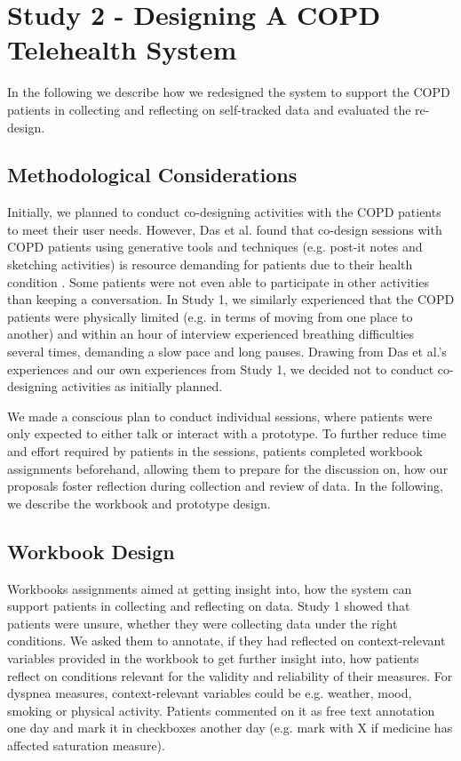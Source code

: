 \section{Study 2 - Designing A COPD Telehealth System}     
In the following we describe how we redesigned the system to support the COPD patients in collecting and reflecting on self-tracked data and evaluated the re-design. 

\subsection{Methodological Considerations}
Initially, we planned to conduct co-designing activities with the COPD patients to meet their user needs. However, Das et al. found that co-design sessions with COPD patients using generative tools and techniques (e.g. post-it notes and sketching activities) is resource demanding for patients due to their health condition \cite{Das}. Some patients were not even able to participate in other activities than keeping a conversation. In Study 1, we similarly experienced that the COPD patients were physically limited (e.g. in terms of moving from one place to another) and within an hour of interview experienced breathing difficulties several times, demanding a slow pace and long pauses. Drawing from Das et al.'s experiences and our own experiences from Study 1, we decided not to conduct co-designing activities as initially planned. 

We made a conscious plan to conduct individual sessions, where patients were only expected to either talk or interact with a prototype. To further reduce time and effort required by patients in the sessions, patients completed workbook assignments beforehand, allowing them to prepare for the discussion on, how our proposals foster reflection during collection and review of data. In the following, we describe the workbook and prototype design.

\subsection{Workbook Design}
Workbooks assignments aimed at getting insight into, how the system can support patients in collecting and reflecting on data. Study 1 showed that patients were unsure, whether they were collecting data under the right conditions. We asked them to annotate, if they had reflected on context-relevant variables provided in the workbook to get further insight into, how patients reflect on conditions relevant for the validity and reliability of their measures. For dyspnea measures, context-relevant variables could be e.g. weather, mood, smoking or physical activity. Patients commented on it as free text annotation one day and mark it in checkboxes another day (e.g. mark with X if medicine has affected saturation measure).

